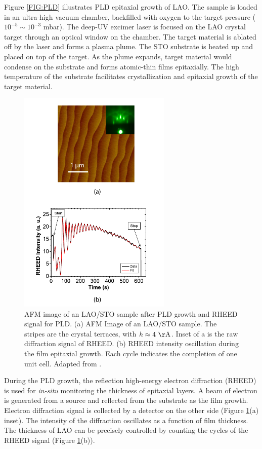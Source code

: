 \documentclass[pdflatex, sectionletters, 12pt, final, phd]{pittetd}    %
\begin{document}
Figure \ref{FIG:PLD} illustrates PLD epitaxial growth of LAO. The sample is loaded in an ultra-high vacuum chamber, backfilled with oxygen to the target pressure ($10^{-5} \sim 10^{-3}$ mbar). The deep-UV excimer laser is focused on the LAO crystal target through an optical window on the chamber. The target material is ablated off by the laser and forms a plasma plume. The STO substrate is heated up and placed on top of the target. As the plume expands, target material would condense on the substrate and forms atomic-thin films epitaxially. The high temperature of the substrate facilitates crystallization and epitaxial growth of the target material. 

\begin{figure}[hp!]
	\centering
	\includegraphics[width=0.65\textwidth]{Drawing/PLD_RHEED.pdf}
	\caption[AFM image of an LAO/STO sample]{AFM image of an LAO/STO sample after PLD growth and RHEED signal for PLD. (a) AFM Image of an LAO/STO sample. The stripes are the crystal terraces, with $h \approx 4 \ \mathrm{\AA}$. Inset of a is the raw diffraction signal of RHEED. (b) RHEED intensity oscillation during the film epitaxial growth. Each cycle indicates the completion of one unit cell. Adapted from \cite{podkaminer2016real}.}
	\label{FIG:RHEED}
\end{figure}

During the PLD growth, the reflection high-energy electron diffraction (RHEED) is used for \emph{in-situ} monitoring the thickness of epitaxial layers. A beam of electron is generated from a source and reflected from the substrate as the film growth. Electron diffraction signal is collected by a detector on the other side (Figure \ref{FIG:RHEED}(a) inset). The intensity of the diffraction oscillates as a function of film thickness. The thickness of LAO can be precisely controlled by counting the cycles of the RHEED signal (Figure \ref{FIG:RHEED}(b)).
\end{document}
